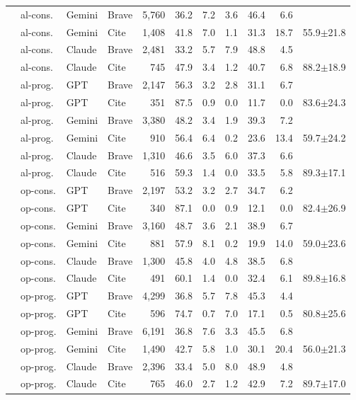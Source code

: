 \begin{table}[t]
\begin{tabular}{llllrrrrrrr}
 & al-cons. & Gemini & Brave & 5{,}760 & 36.2 & 7.2 & 3.6 & 46.4 & 6.6 &  \\
 & al-cons. & Gemini & Cite & 1{,}408 & 41.8 & 7.0 & 1.1 & 31.3 & 18.7 & 55.9$\pm$21.8 \\
 & al-cons. & Claude & Brave & 2{,}481 & 33.2 & 5.7 & 7.9 & 48.8 & 4.5 &  \\
 & al-cons. & Claude & Cite & 745 & 47.9 & 3.4 & 1.2 & 40.7 & 6.8 & 88.2$\pm$18.9 \\
 & al-prog. & GPT & Brave & 2{,}147 & 56.3 & 3.2 & 2.8 & 31.1 & 6.7 &  \\
 & al-prog. & GPT & Cite & 351 & 87.5 & 0.9 & 0.0 & 11.7 & 0.0 & 83.6$\pm$24.3 \\
 & al-prog. & Gemini & Brave & 3{,}380 & 48.2 & 3.4 & 1.9 & 39.3 & 7.2 &  \\
 & al-prog. & Gemini & Cite & 910 & 56.4 & 6.4 & 0.2 & 23.6 & 13.4 & 59.7$\pm$24.2 \\
 & al-prog. & Claude & Brave & 1{,}310 & 46.6 & 3.5 & 6.0 & 37.3 & 6.6 &  \\
 & al-prog. & Claude & Cite & 516 & 59.3 & 1.4 & 0.0 & 33.5 & 5.8 & 89.3$\pm$17.1 \\
 & op-cons. & GPT & Brave & 2{,}197 & 53.2 & 3.2 & 2.7 & 34.7 & 6.2 &  \\
 & op-cons. & GPT & Cite & 340 & 87.1 & 0.0 & 0.9 & 12.1 & 0.0 & 82.4$\pm$26.9 \\
 & op-cons. & Gemini & Brave & 3{,}160 & 48.7 & 3.6 & 2.1 & 38.9 & 6.7 &  \\
 & op-cons. & Gemini & Cite & 881 & 57.9 & 8.1 & 0.2 & 19.9 & 14.0 & 59.0$\pm$23.6 \\
 & op-cons. & Claude & Brave & 1{,}300 & 45.8 & 4.0 & 4.8 & 38.5 & 6.8 &  \\
 & op-cons. & Claude & Cite & 491 & 60.1 & 1.4 & 0.0 & 32.4 & 6.1 & 89.8$\pm$16.8 \\
 & op-prog. & GPT & Brave & 4{,}299 & 36.8 & 5.7 & 7.8 & 45.3 & 4.4 &  \\
 & op-prog. & GPT & Cite & 596 & 74.7 & 0.7 & 7.0 & 17.1 & 0.5 & 80.8$\pm$25.6 \\
 & op-prog. & Gemini & Brave & 6{,}191 & 36.8 & 7.6 & 3.3 & 45.5 & 6.8 &  \\
 & op-prog. & Gemini & Cite & 1{,}490 & 42.7 & 5.8 & 1.0 & 30.1 & 20.4 & 56.0$\pm$21.3 \\
 & op-prog. & Claude & Brave & 2{,}396 & 33.4 & 5.0 & 8.0 & 48.9 & 4.8 &  \\
 & op-prog. & Claude & Cite & 765 & 46.0 & 2.7 & 1.2 & 42.9 & 7.2 & 89.7$\pm$17.0 \\
\bottomrule
\end{tabular}
\end{table}
